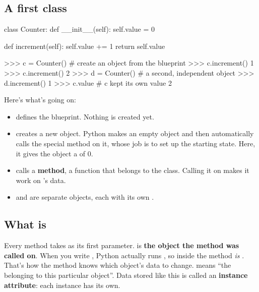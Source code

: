 \documentclass[10pt,a4paper]{article}
\begin{document}
\subsection{A first class}
\begin{pycode}
class Counter:
    def __init__(self):
        self.value = 0

    def increment(self):
        self.value += 1
        return self.value
\end{pycode}
\begin{txtcode}
>>> c = Counter()        # create an object from the blueprint
>>> c.increment()
1
>>> c.increment()
2
>>> d = Counter()        # a second, independent object
>>> d.increment()
1
>>> c.value              # c kept its own value
2
\end{txtcode}
Here’s what’s going on:
\begin{itemize}
\item {} defines the blueprint. Nothing is created yet.
\item {} creates a new object. Python makes an empty object and then automatically calls the special method  on it, whose job is to set up the starting state. Here, it gives the object a  of 0.
\item {} calls a \textbf{method}, a function that belongs to the class. Calling it on  makes it work on ’s data.
\item {} and  are separate objects, each with its own .
\end{itemize}
\subsection{What  is}
Every method takes  as its first parameter.  is \textbf{the object the method was called on}. When you write , Python actually runs , so inside the method  \emph{is} . That’s how the method knows which object’s data to change.
 means “the  belonging to this particular object”. Data stored like this is called an \textbf{instance attribute}: each instance has its own.
\end{document}
